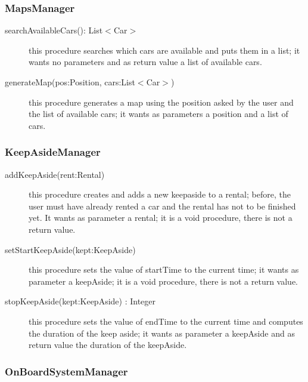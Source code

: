 \documentclass{scrreprt}
\begin{document}
\subsubsection{MapsManager}

\begin{description}
\item[searchAvailableCars(): List$<$Car$>$] this procedure searches which cars are available and puts them in a list; it wants no parameters and as return value a list of available cars.
\item[generateMap(pos:Position, cars:List$<$Car$>$)] this procedure generates a map using the position asked by the user and the list of available cars; it wants as parameters a position and a list of cars.
\end{description}

\subsubsection{KeepAsideManager}

\begin{description}
\item[addKeepAside(rent:Rental)] this procedure creates and adds a new keepaside to a rental; before, the user must have already rented a car and the rental has not to be finished yet. It wants as parameter a rental; it is a void procedure, there is not a return value.
\item[setStartKeepAside(kept:KeepAside)] this procedure sets the value of startTime to the current time; it wants as parameter a keepAside; it is a void procedure, there is not a return value.
\item[stopKeepAside(kept:KeepAside) : Integer] this procedure sets the value of endTime to the current time and computes the duration of the keep aside; it wants as parameter a keepAside and as return value the duration of the keepAside.
\end{description}

\subsubsection{OnBoardSystemManager}
\end{document}
